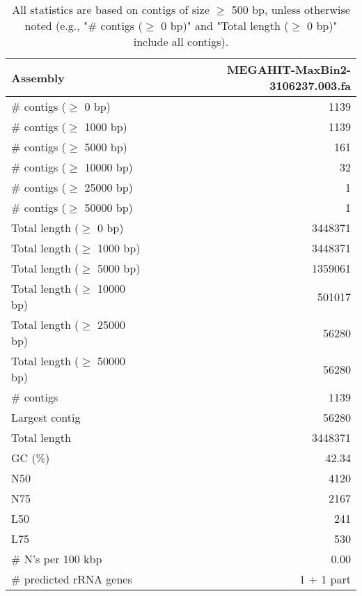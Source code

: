 \documentclass[12pt,a4paper]{article}
\begin{document}
\begin{table}[ht]
\begin{center}
\caption{All statistics are based on contigs of size $\geq$ 500 bp, unless otherwise noted (e.g., "\# contigs ($\geq$ 0 bp)" and "Total length ($\geq$ 0 bp)" include all contigs).}
\begin{tabular}{|l*{1}{|r}|}
\hline
Assembly & MEGAHIT-MaxBin2-3106237.003.fa \\ \hline
\# contigs ($\geq$ 0 bp) & 1139 \\ \hline
\# contigs ($\geq$ 1000 bp) & 1139 \\ \hline
\# contigs ($\geq$ 5000 bp) & 161 \\ \hline
\# contigs ($\geq$ 10000 bp) & 32 \\ \hline
\# contigs ($\geq$ 25000 bp) & 1 \\ \hline
\# contigs ($\geq$ 50000 bp) & 1 \\ \hline
Total length ($\geq$ 0 bp) & 3448371 \\ \hline
Total length ($\geq$ 1000 bp) & 3448371 \\ \hline
Total length ($\geq$ 5000 bp) & 1359061 \\ \hline
Total length ($\geq$ 10000 bp) & 501017 \\ \hline
Total length ($\geq$ 25000 bp) & 56280 \\ \hline
Total length ($\geq$ 50000 bp) & 56280 \\ \hline
\# contigs & 1139 \\ \hline
Largest contig & 56280 \\ \hline
Total length & 3448371 \\ \hline
GC (\%) & 42.34 \\ \hline
N50 & 4120 \\ \hline
N75 & 2167 \\ \hline
L50 & 241 \\ \hline
L75 & 530 \\ \hline
\# N's per 100 kbp & 0.00 \\ \hline
\# predicted rRNA genes & 1 + 1 part \\ \hline
\end{tabular}
\end{center}
\end{table}
\end{document}
